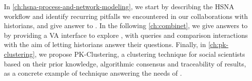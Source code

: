 In \autoref{ch:hsna-process-and-network-modeling}, we start by describing the HSNA workflow and identify recurring pitfalls we encountered in our collaborations with historians, and give answer to \qone.
In the following \autoref{ch:combinet}, we give answers to \qtwo by providing a VA interface to explore \modelplural, with queries and comparison interactions with the aim of letting historians answer their questions.
Finally, in \autoref{ch:pk-clustering}, we propose PK-Clustering, a clustering technique for social scientists based on their prior knowledge, algorithmic consensus and traceability of results, as a concrete example of technique answering the needs of \qthree.










%





